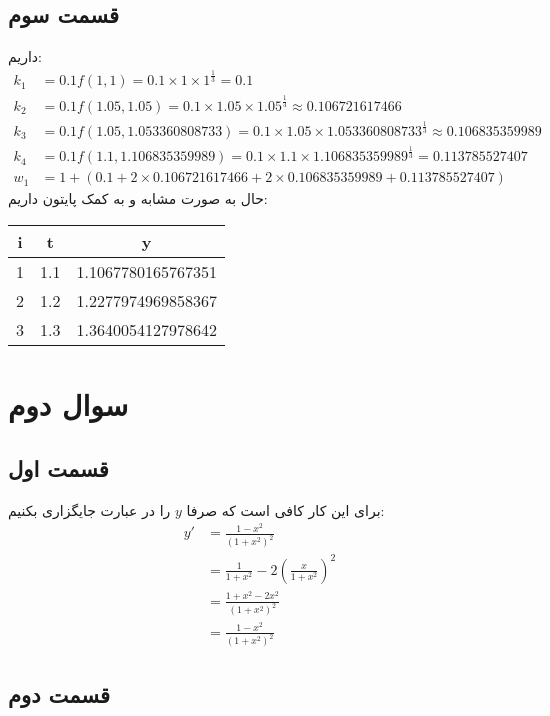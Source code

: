 \documentclass[]{article}
\begin{document}
\subsection*{قسمت سوم}
داریم:
\begin{align*}
    k_1 &= 0.1 f(1, 1) = 0.1 \times 1 \times 1^\frac{1}{3} = 0.1\\
    k_2 &= 0.1 f(1.05, 1.05) = 0.1 \times 1.05 \times 1.05^\frac{1}{3} \approx 0.106721617466\\
    k_3 &= 0.1 f(1.05, 1.053360808733) = 0.1 \times 1.05 \times 1.053360808733^\frac{1}{3} \approx 0.106835359989\\
    k_4 &= 0.1 f(1.1, 1.106835359989) = 0.1 \times 1.1 \times 1.106835359989^\frac{1}{3} = 0.113785527407\\
    w_1 &= 1 + (0.1 + 2 \times 0.106721617466 + 2 \times 0.106835359989 + 0.113785527407)
\end{align*}
حال به صورت مشابه و به کمک پایتون داریم:
\begin{latin}
    \centering
    \begin{tabular}{c|c|c}
        i & t & y\\
        \hline
        1 & 1.1 & 1.1067780165767351\\
        2 & 1.2 & 1.2277974969858367\\
        3 & 1.3 & 1.3640054127978642\\
    \end{tabular}
\end{latin}
\section*{سوال دوم}
\subsection*{قسمت اول}
برای این کار کافی است که صرفا
$y$
را در عبارت جایگزاری بکنیم:
\begin{align*}
    y' &= \frac{1 - x^2}{(1 + x^2)^2} \\
    &= \frac{1}{1 + x^2} - 2 \left(\frac{x}{1 + x^2}\right)^2\\
    &= \frac{1 + x^2 - 2x^2}{(1 + x^2)^2}\\
    &= \frac{1 - x^2}{(1 + x^2)^2}
\end{align*}
\subsection*{قسمت دوم}
\end{document}
